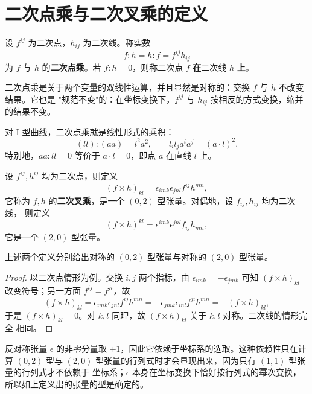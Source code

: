 \section{二次点乘与二次叉乘的定义}

\begin{definition}[二次点乘]
设 $f^{ij}$ 为二次点，$h_{ij}$ 为二次线。称实数
\[
f:h=h:f=f^{ij}h_{ij}
\]
为 $f$ 与 $h$ 的\textbf{二次点乘}。若 $f:h=0$，则称二次点 $f$ \textbf{在}二次线 $h$ \textbf{上}。
\end{definition}

二次点乘是关于两个变量的双线性运算，并且显然是对称的：交换 $f$ 与 $h$ 不改变结果。它也是
"规范不变"的：在坐标变换下，$f^{ij}$ 与 $h_{ij}$ 按相反的方式变换，缩并的结果不变。

\begin{example}
对 I 型曲线，二次点乘就是线性形式的乘积：
\[
(ll):(aa)=l^2a^2,\qquad
l_il_ja^ia^j=(a\cdot l)^2 .
\]
特别地，$aa:ll=0$ 等价于 $a\cdot l=0$，即点 $a$ 在直线 $l$ 上。
\end{example}

\begin{definition}[二次叉乘]
设 $f^{ij},h^{ij}$ 均为二次点，则定义
\[
(f\times h)_{kl}=\epsilon_{imk}\epsilon_{jnl}f^{ij}h^{mn},
\]
它称为 $f,h$ 的\textbf{二次叉乘}，是一个 $(0,2)$ 型张量。对偶地，设 $f_{ij},h_{ij}$ 均为二次线，
则定义
\[
(f\times h)^{kl}=\epsilon^{imk}\epsilon^{jnl}f_{ij}h_{mn},
\]
它是一个 $(2,0)$ 型张量。
\end{definition}

\begin{proposition}[二次叉乘的对称性]
上述两个定义分别给出对称的 $(0,2)$ 型张量与对称的 $(2,0)$ 型张量。
\end{proposition}

\begin{proof}
以二次点情形为例。交换 $i,j$ 两个指标，由 $\epsilon_{imk}=-\epsilon_{jmk}$ 可知
$(f\times h)_{kl}$ 改变符号；另一方面 $f^{ij}=f^{ji}$，故
\[
(f\times h)_{kl}=\epsilon_{imk}\epsilon_{jnl}f^{ij}h^{mn}
=-\epsilon_{jmk}\epsilon_{inl}f^{ji}h^{mn}=-(f\times h)_{kl},
\]
于是 $(f\times h)_{kl}=0$。对 $k,l$ 同理，故 $(f\times h)_{kl}$ 关于 $k,l$ 对称。二次线的情形完全
相同。
\end{proof}

\begin{remark}
反对称张量 $\epsilon$ 的非零分量取 $\pm1$，因此它依赖于坐标系的选取。这种依赖性只在计算
$(0,2)$ 型与 $(2,0)$ 型张量的行列式时才会显现出来，因为只有 $(1,1)$ 型张量的行列式才不依赖于
坐标系；$\epsilon$ 本身在坐标变换下恰好按行列式的幂次变换，所以如上定义出的张量的型是确定的。
\end{remark}

